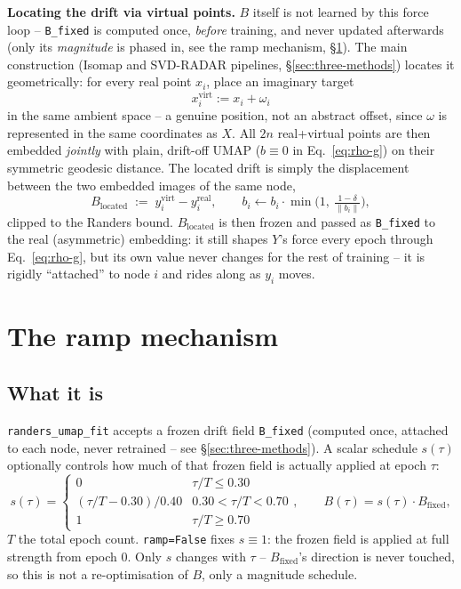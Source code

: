 \documentclass[11pt]{article}
\begin{document}
\textbf{Locating the drift via virtual points.} $B$ itself is not learned by this force loop --
\texttt{B\_fixed} is computed once, \emph{before} training, and never updated afterwards (only its
\emph{magnitude} is phased in, see the ramp mechanism, \S\ref{sec:ramp}). The main construction
(Isomap and SVD-RADAR pipelines, \S\ref{sec:three-methods}) locates it geometrically: for every
real point $x_i$, place an imaginary target
\begin{equation}
x_i^{\mathrm{virt}} := x_i + \omega_i
\end{equation}
in the same ambient space -- a genuine position, not an abstract offset, since $\omega$ is
represented in the same coordinates as $X$. All $2n$ real+virtual points are then embedded
\emph{jointly} with plain, drift-off UMAP ($b\equiv0$ in Eq.~\eqref{eq:rho-g}) on their symmetric
geodesic distance. The located drift is simply the displacement between the two embedded images of
the same node,
\begin{equation}
B_{\mathrm{located}} \;:=\; y_i^{\mathrm{virt}} - y_i^{\mathrm{real}}, \qquad
b_i \leftarrow b_i\cdot\min\!\Big(1,\ \tfrac{1-\delta}{\lVert b_i\rVert}\Big),
\label{eq:located}
\end{equation}
clipped to the Randers bound. $B_{\mathrm{located}}$ is then frozen and passed as
\texttt{B\_fixed} to the real (asymmetric) embedding: it still shapes $Y$'s force every epoch
through Eq.~\eqref{eq:rho-g}, but its own value never changes for the rest of training -- it is
rigidly ``attached'' to node $i$ and rides along as $y_i$ moves.

\section{The ramp mechanism}
\label{sec:ramp}

\subsection{What it is}

\texttt{randers\_umap\_fit} accepts a frozen drift field \texttt{B\_fixed} (computed once,
attached to each node, never retrained -- see \S\ref{sec:three-methods}). A scalar schedule $s(\tau)$
optionally controls how much of that frozen field is actually applied at epoch $\tau$:
\begin{equation}
s(\tau) = \begin{cases} 0 & \tau/T \le 0.30 \\ (\tau/T-0.30)/0.40 & 0.30<\tau/T<0.70 \\ 1 & \tau/T\ge0.70\end{cases},
\qquad B(\tau) = s(\tau)\cdot B_{\mathrm{fixed}},
\label{eq:ramp}
\end{equation}
$T$ the total epoch count. \texttt{ramp=False} fixes $s\equiv1$: the frozen field is applied at
full strength from epoch 0. Only $s$ changes with $\tau$ -- $B_{\mathrm{fixed}}$'s direction is
never touched, so this is not a re-optimisation of $B$, only a magnitude schedule.
\end{document}
